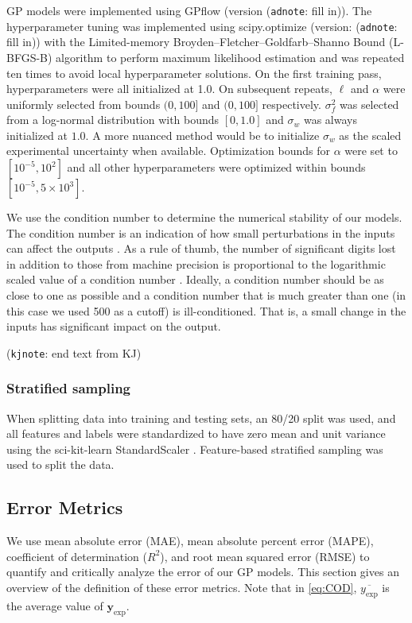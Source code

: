 \documentclass[journal=jacsat,manuscript=article]{achemso}
\newcommand{\kjnote}[1]{{\color{Blue} (\texttt{kjnote}: #1)}}
\newcommand{\adnote}[1]{{\color{OliveGreen} (\texttt{adnote}: #1)}}
\begin{document}
 GP models were implemented using GPflow \cite{Matthews2017GPflow:TensorFlow} (version \adnote{fill in}). The hyperparameter tuning was implemented using scipy.optimize \cite{Virtanen2020SciPyPython} (version: \adnote{fill in}) with the Limited-memory Broyden–Fletcher–Goldfarb–Shanno Bound (L-BFGS-B) algorithm to perform maximum likelihood estimation and was repeated ten times to avoid local hyperparameter solutions. On the first training pass, hyperparameters were all initialized at 1.0. On subsequent repeats, $\ell$ and $\alpha$ were uniformly selected from bounds $(0, 100]$ and $(0, 100]$ respectively. $\sigma^2_f$ was selected from a log-normal distribution with bounds $[0,1.0]$ and $\sigma_w$ was always initialized at $1.0$. A more nuanced method would be to initialize $\sigma_w$ as the scaled experimental uncertainty when available. Optimization bounds for $\alpha$ were set to $[10^{-5}, 10^2]$ and all other hyperparameters were optimized within bounds $[10^{-5}, 5\times 10^3]$.

 We use the condition number to determine the numerical stability of our models. The condition number is an indication of how small perturbations in the inputs can affect the outputs \cite{Foster2009}. As a rule of thumb, the number of significant digits lost in addition to those from machine precision is proportional to the logarithmic scaled value of a condition number \cite{NumMathComput}. Ideally, a condition number should be as close to one as possible and a condition number that is much greater than one (in this case we used 500 as a cutoff) is ill-conditioned. That is, a small change in the inputs has significant impact on the output.

\kjnote{end text from KJ}

\subsubsection{Stratified sampling}
When splitting data into training and testing sets, an 80/20 split was used, and all features and labels were standardized to have zero mean and unit variance using the sci-kit-learn StandardScaler \cite{scikit-learn}. Feature-based stratified sampling was used to split the data.

\subsection{Error Metrics}
We use mean absolute error (MAE), mean absolute percent error (MAPE), coefficient of determination ($R^2$), and root mean squared error (RMSE) to quantify and critically analyze the error of our GP models. This section gives an overview of the definition of these error metrics. Note that in \eqref{eq:COD}, $\overline{y_{\text{exp}}}$ is the average value of $\mathbf{y}_{\text{exp}}$. 
\end{document}
